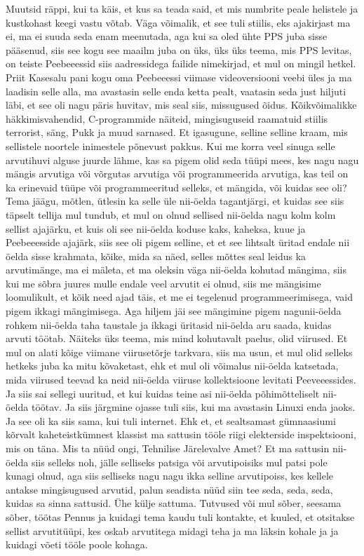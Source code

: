Muutsid räppi, kui ta käis, et kus sa teada said, et mis numbrite peale helistele ja kustkohast keegi vastu võtab.
Väga võimalik, et see tuli stiilis, eks ajakirjast ma ei, ma ei suuda seda enam meenutada, aga kui sa oled ühte PPS juba sisse pääsenud, siis see kogu see maailm juba on üks, üks üks teema, mis PPS levitas, on teiste Peebeeessid siis aadressidega failide nimekirjad, et mul on mingil hetkel. Priit Kasesalu pani kogu oma Peebeeessi viimase videoversiooni veebi üles ja ma laadisin selle alla, ma avastasin selle enda ketta pealt, vaatasin seda just hiljuti läbi, et see oli nagu päris huvitav, mis seal siis, missugused õidus. Kõikvõimalikke häkkimisvahendid, C-programmide näiteid, mingisuguseid raamatuid stiilis terrorist, säng, Pukk ja muud sarnased. Et igasugune, selline selline kraam, mis sellistele noortele inimestele põnevust pakkus.
Kui me korra veel sinuga selle arvutihuvi alguse juurde lähme, kas sa pigem olid seda tüüpi mees, kes nagu nagu mängis arvutiga või võrgutas arvutiga või programmeerida arvutiga, kas teil on ka erinevaid tüüpe või programmeeritud selleks, et mängida, või kuidas see oli?
Tema jäägu, mõtlen, ütlesin ka selle üle nii-öelda tagantjärgi, et kuidas see siis täpselt tellija mul tundub, et mul on olnud sellised nii-öelda nagu kolm kolm sellist ajajärku, et kuis oli see nii-öelda koduse kaks, kaheksa, kuue ja Peebeeesside ajajärk, siis see oli pigem selline, et et see lihtsalt üritad endale nii öelda sisse krahmata, kõike, mida sa näed, selles mõttes seal leidus ka arvutimänge, ma ei mäleta, et ma oleksin väga nii-öelda kohutad mängima, siis kui me sõbra juures mulle endale veel arvutit ei olnud, siis me mängisime loomulikult, et kõik need ajad täis, et me ei tegelenud programmeerimisega, vaid pigem ikkagi mängimisega. Aga hiljem jäi see mängimine pigem nagunii-öelda rohkem nii-öelda taha taustale ja ikkagi üritasid nii-öelda aru saada, kuidas arvuti töötab. Näiteks üks teema, mis mind kohutavalt paelus, olid viirused. Et mul on alati kõige viimane viirusetõrje tarkvara, siis ma usun, et mul olid selleks hetkeks juba ka mitu kõvaketast, ehk et mul oli võimalus nii-öelda katsetada, mida viirused teevad ka neid nii-öelda viiruse kollektsioone levitati Peeveeessides. Ja siis sai sellegi uuritud, et kui kuidas teine asi nii-öelda põhimõtteliselt nii-öelda töötav. Ja siis järgmine ojasse tuli siis, kui ma avastasin Linuxi enda jaoks. Ja see oli ka siis sama, kui tuli internet. Ehk et, et sealtsamast gümnaasiumi kõrvalt kaheteistkümnest klassist ma sattusin tööle riigi elekterside inspektsiooni, mis on täna. Mis ta nüüd ongi, Tehnilise Järelevalve Amet? Et ma sattusin nii-öelda siis selleks noh, jälle selliseks patsiga või arvutipoisiks mul patsi pole kunagi olnud, aga siis selliseks nagu nagu ikka selline arvutipoiss, kes kellele antakse mingisugused arvutid, palun seadista nüüd siin tee seda, seda, seda, kuidas sa sinna sattusid. Ühe külje sattuma. Tutvused või mul sõber, seesama sõber, töötas Pennus ja kuidagi tema kaudu tuli kontakte, et kuuled, et otsitakse sellist arvutitüüpi, kes oskab arvutitega midagi teha ja ma läksin kohale ja ja kuidagi võeti tööle poole kohaga.
